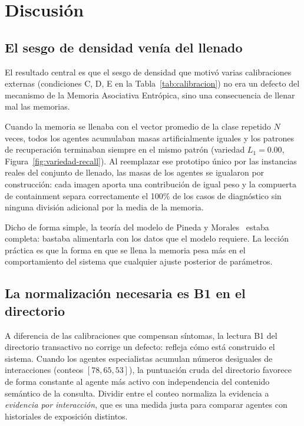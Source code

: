 \section{Discusión}
\label{sec:discusion}

\subsection{El sesgo de densidad venía del llenado}
\label{sec:disc-sesgo}

El resultado central es que el sesgo de densidad que motivó varias calibraciones externas (condiciones C, D, E en la Tabla~\ref{tab:calibracion}) no era un defecto del mecanismo de la Memoria Asociativa Entrópica, sino una consecuencia de llenar mal las memorias.

Cuando la memoria se llenaba con el vector promedio de la clase repetido $N$ veces, todos los agentes acumulaban masas artificialmente iguales y los patrones de recuperación terminaban siempre en el mismo patrón (variedad $L_1 = 0.00$, Figura~\ref{fig:variedad-recall}).
Al reemplazar ese prototipo único por las instancias reales del conjunto de llenado, las masas de los agentes se igualaron por construcción: cada imagen aporta una contribución de igual peso y la compuerta de containment separa correctamente el 100\% de los casos de diagnóstico sin ninguna división adicional por la media de la memoria.

Dicho de forma simple, la teoría del modelo de Pineda y Morales~\cite{pineda2021entropic} estaba completa: bastaba alimentarla con los datos que el modelo requiere.
La lección práctica es que la forma en que se llena la memoria pesa más en el comportamiento del sistema que cualquier ajuste posterior de parámetros.

\subsection{La normalización necesaria es B1 en el directorio}
\label{sec:disc-b1}

A diferencia de las calibraciones que compensan síntomas, la lectura B1 del directorio transactivo no corrige un defecto: refleja cómo está construido el sistema.
Cuando los agentes especialistas acumulan números desiguales de interacciones (conteos $[78, 65, 53]$), la puntuación cruda del directorio favorece de forma constante al agente más activo con independencia del contenido semántico de la consulta.
Dividir entre el conteo normaliza la evidencia a \textit{evidencia por interacción}, que es una medida justa para comparar agentes con historiales de exposición distintos.

